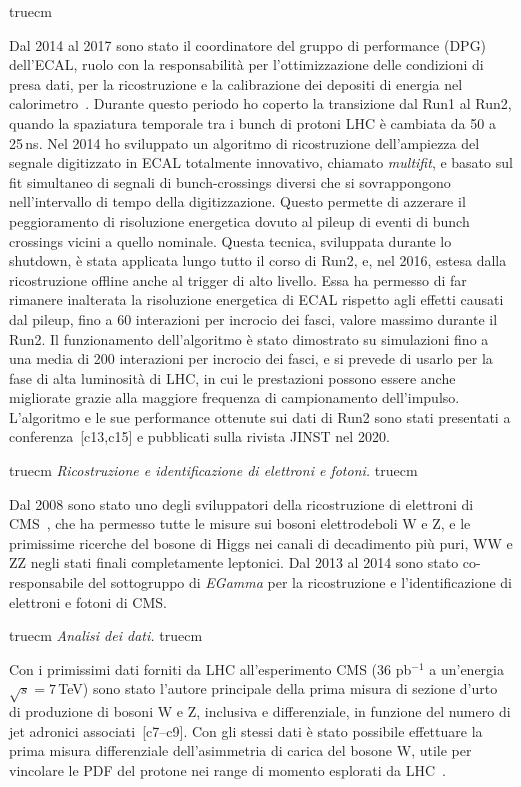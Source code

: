 \documentclass[11pt,twoside,a4paper]{article}
\begin{document}
 truecm

Dal 2014 al 2017 sono stato il coordinatore del gruppo di performance
(DPG) dell'ECAL, ruolo con la responsabilit\`a per l'ottimizzazione
delle condizioni di presa dati, per la ricostruzione e la calibrazione
dei depositi di energia nel
calorimetro~\cite{Khachatryan:2015iwa}. Durante questo periodo ho
coperto la transizione dal Run1 al Run2, quando la spaziatura
temporale tra i bunch di protoni LHC \`e cambiata da 50 a 25\,ns. Nel
2014 ho sviluppato un algoritmo di ricostruzione dell'ampiezza del
segnale digitizzato in ECAL totalmente innovativo, chiamato
\textit{multifit}, e basato sul fit simultaneo di segnali di
bunch-crossings diversi che si sovrappongono nell'intervallo di tempo
della digitizzazione.  Questo permette di azzerare il peggioramento di
risoluzione energetica dovuto al pileup di eventi di bunch crossings
vicini a quello nominale.  Questa tecnica, sviluppata durante lo
shutdown, \`e stata applicata lungo tutto il corso di Run2, e, nel
2016, estesa dalla ricostruzione offline anche al trigger di alto
livello.  Essa ha permesso di far rimanere inalterata la risoluzione
energetica di ECAL rispetto agli effetti causati dal pileup, fino a 60
interazioni per incrocio dei fasci, valore massimo durante il Run2.
Il funzionamento dell'algoritmo \`e stato dimostrato su simulazioni
fino a una media di 200 interazioni per incrocio dei fasci, e si
prevede di usarlo per la fase di alta luminosit\`a di LHC, in cui le
prestazioni possono essere anche migliorate grazie alla maggiore
frequenza di campionamento dell'impulso. L'algoritmo e le sue
performance ottenute sui dati di Run2 sono stati presentati a
conferenza~[c13,c15] e pubblicati sulla rivista JINST nel 2020.

 truecm
\textit{Ricostruzione e identificazione di elettroni e fotoni.}
 truecm

Dal 2008 sono stato uno degli sviluppatori della ricostruzione di
elettroni di CMS~\cite{Khachatryan:2015hwa}, che ha permesso tutte le
misure sui bosoni elettrodeboli W e Z, e le primissime ricerche del
bosone di Higgs nei canali di decadimento pi\`u puri, WW e ZZ negli
stati finali completamente leptonici. Dal 2013 al 2014 sono stato
co-responsabile del sottogruppo di \textit{EGamma} per la
ricostruzione e l'identificazione di elettroni e fotoni di CMS.

 truecm
\textit{Analisi dei dati.}
 truecm

Con i primissimi dati forniti da LHC all'esperimento CMS (36 pb$^{-1}$
a un'energia $\sqrt{s}=7$\,TeV) sono stato l'autore principale della
prima misura di sezione d'urto di produzione di bosoni W e Z,
inclusiva e differenziale, in funzione del numero di jet adronici
associati~\cite{Chatrchyan:2011ne,Marco:2009dvd,Khachatryan:2010xn,CMS:2011aa}[c7--c9].
Con gli stessi dati \`e stato possibile effettuare la prima misura
differenziale dell'asimmetria di carica del bosone W, utile per
vincolare le PDF del protone nei range di momento esplorati da
LHC~\cite{Chatrchyan:2011jz}.
\end{document}
